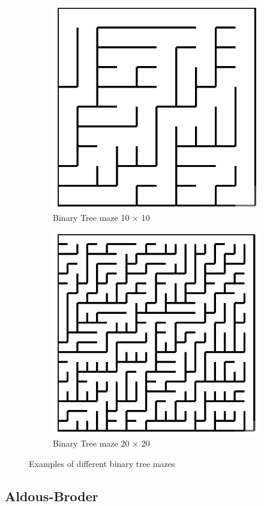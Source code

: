 \begin{figure}[!h]
	\centering
	\begin{subfigure}{.45\textwidth}
	  \centering
	  \includegraphics[width=.6\linewidth]{binary1010}
	  \caption{Binary Tree maze 10 $\times$ 10}
	  \label{fig:sub1}
	\end{subfigure}
	\begin{subfigure}{.45\textwidth}
	  \centering
	  \includegraphics[width=.6\linewidth]{binary2020}
	  \caption{Binary Tree maze 20 $\times$ 20}
	  \label{fig:sub2}
	\end{subfigure}
	\caption{Examples of different binary tree mazes}
	\label{fig:test}
	\end{figure}

\subsection{Aldous-Broder}


